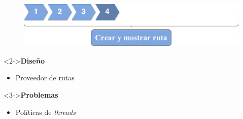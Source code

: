 \begin{slide}
  \begin{center}
    \begin{figure}[!h]
      \includegraphics[height=0.27\textheight]{img/ite4.png}
    \end{figure}
    \vspace{0.5cm}
    \begin{minipage}[b]{0.4\linewidth}
      \begin{block}<2->{\textbf{Diseño}}
        \begin{itemize}
          \item Proveedor de rutas
        \end{itemize}
      \end{block}
    \end{minipage}
    \hspace{0.5cm}
    \begin{minipage}[b]{0.4\linewidth}
      \begin{block}<3->{\textbf{Problemas}}
        \begin{itemize}
          \item Políticas de \emph{threads}
        \end{itemize}
      \end{block}
    \end{minipage}
  \end{center}
\end{slide}

